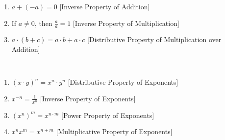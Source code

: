 \documentclass[crop=false,class=article,oneside]{standalone}
\begin{document}
\begin{properties}
\begin{enumerate}
                    \label{%
                        property:%
                        north_shore_arithmetic_properties_%
                        mult_identity%
                    }
                    ${a}\cdot{1}=a$\hfill
                    [Identity Property of Multiplication]
                \item
                    \label{%
                        property:%
                        north_shore_arithmetic_properties_%
                        add_inverse%
                    }
                    $a+(-a)=0$\hfill
                    [Inverse Property of Addition]
                \item
                    \label{%
                        property:%
                        north_shore_arithmetic_properties_%
                        mult_inverse%
                    }
                    If ${a}\ne{0}$, then $\frac{a}{a}=1$\hfill
                    [Inverse Property of Multiplication]
                \item
                    \label{%
                        property:%
                        north_shore_arithmetic_properties_%
                        distributive_property%
                    }
                    ${a}\cdot{(b+c)}%
                     ={a}\cdot{b}+{a}\cdot{c}$\hfill
                    [Distributive Property of
                     Multiplication over Addition]
            \end{enumerate}
        \end{properties}
        \begin{properties}
            \
            \label{property:North_Shore_Exponent_Rules}
            \begin{enumerate}
                \item
                    \label{%
                        property:%
                        north_shore_distributive_property_%
                        of_expo%
                    }
                    $({x}\cdot{y})^{n}%
                     ={x^{n}}\cdot{y^{n}}$\hfill
                    [Distributive Property of Exponents]
                \item
                    \label{%
                        property:%
                        north_shore_inverse_property_of_expo%
                    }
                    $x^{-n}=\frac{1}{x^n}$\hfill
                    [Inverse Property of Exponents]
                \item
                    \label{%
                        property:%
                        north_shore_power_property_of_expo%
                    }
                    $(x^n)^{m}=x^{{n}\cdot{m}}$\hfill
                    [Power Property of Exponents]
                \item
                    \label{%
                        property:%
                        north_shore_product_property_of_expo%
                    }
                    $x^{n}x^{m}=x^{n+m}$\hfill
                    [Multiplicative Property of Exponents]
            \end{enumerate}
        \end{properties}
\end{document}
